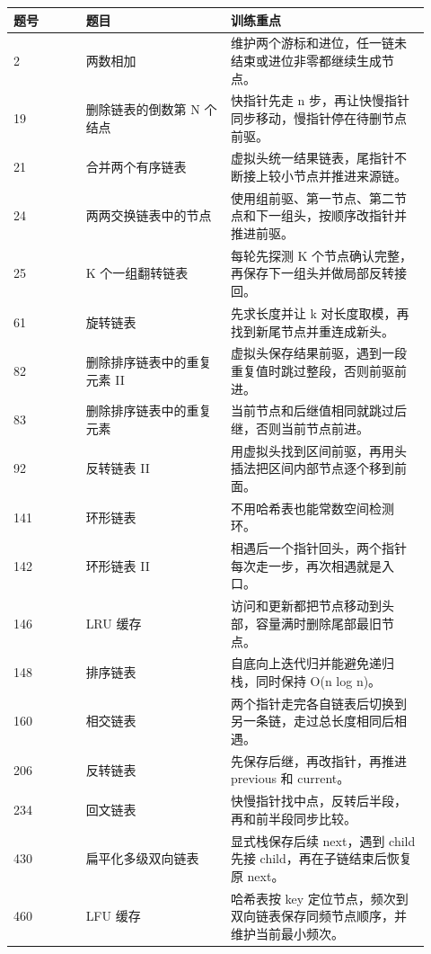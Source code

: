 \begin{longtable}{@{}p{0.16\linewidth}p{0.32\linewidth}p{0.44\linewidth}@{}}
\toprule
题号 & 题目 & 训练重点\\
\midrule
\endhead
2 & 两数相加 & 维护两个游标和进位，任一链未结束或进位非零都继续生成节点。\\
19 & 删除链表的倒数第 N 个结点 & 快指针先走 n 步，再让快慢指针同步移动，慢指针停在待删节点前驱。\\
21 & 合并两个有序链表 & 虚拟头统一结果链表，尾指针不断接上较小节点并推进来源链。\\
24 & 两两交换链表中的节点 & 使用组前驱、第一节点、第二节点和下一组头，按顺序改指针并推进前驱。\\
25 & K 个一组翻转链表 & 每轮先探测 K 个节点确认完整，再保存下一组头并做局部反转接回。\\
61 & 旋转链表 & 先求长度并让 k 对长度取模，再找到新尾节点并重连成新头。\\
82 & 删除排序链表中的重复元素 II & 虚拟头保存结果前驱，遇到一段重复值时跳过整段，否则前驱前进。\\
83 & 删除排序链表中的重复元素 & 当前节点和后继值相同就跳过后继，否则当前节点前进。\\
92 & 反转链表 II & 用虚拟头找到区间前驱，再用头插法把区间内部节点逐个移到前面。\\
141 & 环形链表 & 不用哈希表也能常数空间检测环。\\
142 & 环形链表 II & 相遇后一个指针回头，两个指针每次走一步，再次相遇就是入口。\\
146 & LRU 缓存 & 访问和更新都把节点移动到头部，容量满时删除尾部最旧节点。\\
148 & 排序链表 & 自底向上迭代归并能避免递归栈，同时保持 O(n log n)。\\
160 & 相交链表 & 两个指针走完各自链表后切换到另一条链，走过总长度相同后相遇。\\
206 & 反转链表 & 先保存后继，再改指针，再推进 previous 和 current。\\
234 & 回文链表 & 快慢指针找中点，反转后半段，再和前半段同步比较。\\
430 & 扁平化多级双向链表 & 显式栈保存后续 next，遇到 child 先接 child，再在子链结束后恢复原 next。\\
460 & LFU 缓存 & 哈希表按 key 定位节点，频次到双向链表保存同频节点顺序，并维护当前最小频次。\\
\bottomrule
\end{longtable}


